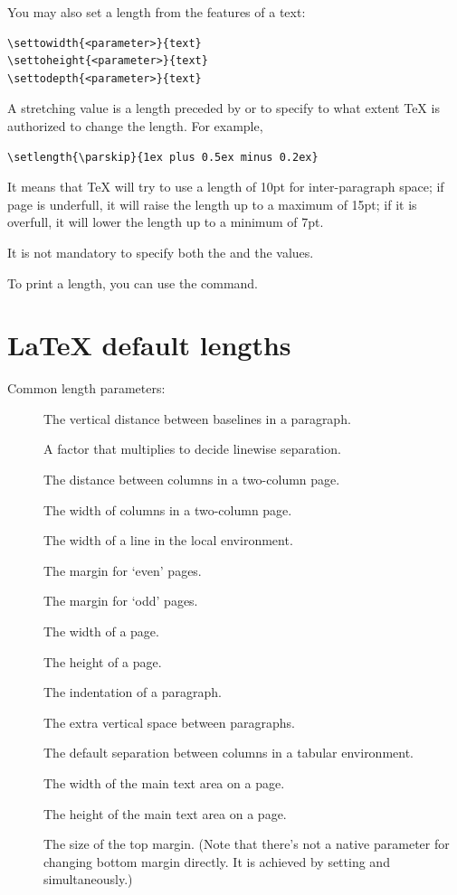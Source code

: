 \documentclass[a4paper,oneside]{book}
\newcommand{\syntax}[1]{\PVerb{#1}}
\newcommand{\command}[1]{\PVerb{#1}}
\begin{document}
You may also set a length from the features of a text:
\begin{lstlisting}
\settowidth{<parameter>}{text}
\settoheight{<parameter>}{text}
\settodepth{<parameter>}{text}
\end{lstlisting}

A stretching value is a length preceded by \syntax{plus} or \syntax{minus} to specify to what extent \TeX{} is authorized to change the length.
For example,
\begin{lstlisting}
\setlength{\parskip}{1ex plus 0.5ex minus 0.2ex}
\end{lstlisting}
It means that \TeX{} will try to use a length of 10pt for inter-paragraph space; if page is underfull, it will raise the length up to a maximum of 15pt; if it is overfull, it will lower the length up to a minimum of 7pt.

It is not mandatory to specify both the \syntax{plus} and the \syntax{minus} values.

To print a length, you can use the \command{\the} command.

\section{\LaTeX{} default lengths}
Common length parameters:
\begin{description}
  \item[\syntax{\baselineskip}] The vertical distance between baselines in a paragraph.
  \item[\syntax{\baselinestretch}] A factor that multiplies \syntax{\baselineskip} to decide linewise separation.
  \item[\syntax{\columnsep}] The distance between columns in a two-column page.
  \item[\syntax{\columnwidth}] The width of columns in a two-column page.
  \item[\syntax{\linewidth}] The width of a line in the local environment.
  \item[\syntax{\evensidemargin}] The margin for `even' pages.
  \item[\syntax{\oddsidemargin}] The margin for `odd' pages.
  \item[\syntax{\paperwidth}] The width of a page.
  \item[\syntax{\paperheight}] The height of a page.
  \item[\syntax{\parindent}] The indentation of a paragraph.
  \item[\syntax{\parskip}] The extra vertical space between paragraphs.
  \item[\syntax{\tabcolsep}] The default separation between columns in a tabular environment.
  \item[\syntax{\textwidth}] The width of the main text area on a page.
  \item[\syntax{\textheight}] The height of the main text area on a page.
  \item[\syntax{\topmargin}] The size of the top margin. (Note that there's not a native parameter for changing bottom margin directly. It is achieved by setting \syntax{\topmargin} and \syntax{\textheight} simultaneously.)
\end{description}
\end{document}
